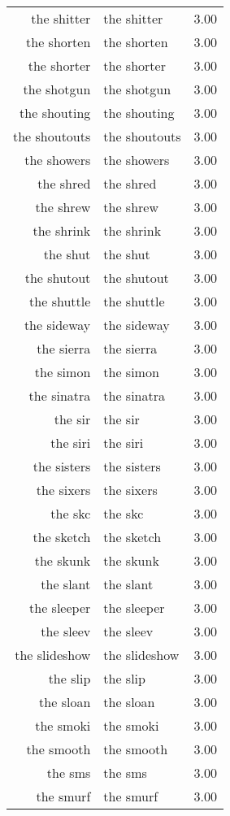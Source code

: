\begin{table}[ht]
\begin{tabular}{rlr}
  the shitter & the shitter & 3.00 \\ 
  the shorten & the shorten & 3.00 \\ 
  the shorter & the shorter & 3.00 \\ 
  the shotgun & the shotgun & 3.00 \\ 
  the shouting & the shouting & 3.00 \\ 
  the shoutouts & the shoutouts & 3.00 \\ 
  the showers & the showers & 3.00 \\ 
  the shred & the shred & 3.00 \\ 
  the shrew & the shrew & 3.00 \\ 
  the shrink & the shrink & 3.00 \\ 
  the shut & the shut & 3.00 \\ 
  the shutout & the shutout & 3.00 \\ 
  the shuttle & the shuttle & 3.00 \\ 
  the sideway & the sideway & 3.00 \\ 
  the sierra & the sierra & 3.00 \\ 
  the simon & the simon & 3.00 \\ 
  the sinatra & the sinatra & 3.00 \\ 
  the sir & the sir & 3.00 \\ 
  the siri & the siri & 3.00 \\ 
  the sisters & the sisters & 3.00 \\ 
  the sixers & the sixers & 3.00 \\ 
  the skc & the skc & 3.00 \\ 
  the sketch & the sketch & 3.00 \\ 
  the skunk & the skunk & 3.00 \\ 
  the slant & the slant & 3.00 \\ 
  the sleeper & the sleeper & 3.00 \\ 
  the sleev & the sleev & 3.00 \\ 
  the slideshow & the slideshow & 3.00 \\ 
  the slip & the slip & 3.00 \\ 
  the sloan & the sloan & 3.00 \\ 
  the smoki & the smoki & 3.00 \\ 
  the smooth & the smooth & 3.00 \\ 
  the sms & the sms & 3.00 \\ 
  the smurf & the smurf & 3.00 \\ 

\end{tabular}
\end{table}
